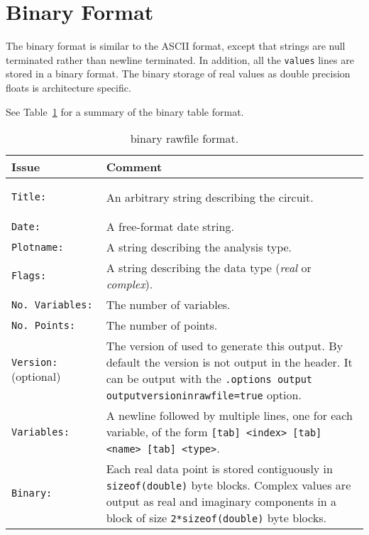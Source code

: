 \section{Binary Format}
\label{rawformatbinary}

The binary format is similar to the ASCII format, except that strings are null
terminated rather than newline terminated. In addition, all the \texttt{values}
lines are stored in a binary format. The binary storage of real values as
double precision floats is architecture specific.

See Table~\ref{table_rawformatbinary} for a summary of the binary table format.

\begin{longtable}[h] {>{\raggedright\small}m{1.5in}|>{\raggedright\let\\\tabularnewline\small}m{4.5in}}
  \caption{\Xyce{} binary rawfile format.} \\ \hline
  \rowcolor{XyceDarkBlue}
  \color{white}\bf Issue & 
  \color{white}\bf Comment \\ \hline \endfirsthead  
  \label{table_rawformatbinary}

    \texttt{Title:} & 
    An arbitrary string describing the circuit.
    \\ \hline

    \texttt{Date:} & 
    A free-format date string.
    \\ \hline

    \texttt{Plotname:} & 
    A string describing the analysis type.
    \\ \hline

    \texttt{Flags:} & 
    A string describing the data type (\emph{real} or \emph{complex}).
    \\ \hline

    \texttt{No.~Variables:} & 
    The number of variables.
    \\ \hline

    \texttt{No.~Points:} & 
    The number of points.
    \\ \hline
    
    \texttt{Version:} (optional) &
    The version of \Xyce{} used to generate this output. By default the version is not output in the header.  It can 
    be output with the \texttt{.options output outputversioninrawfile=true} option.
    \\ \hline

    \texttt{Variables:} & 
    A newline followed by multiple lines, one for each variable, of the form 
    \texttt{[tab] <index> [tab] <name> [tab] <type>}.
    \\ \hline

    \texttt{Binary:} & 
    Each real data point is stored contiguously in \texttt{sizeof(double)} byte blocks. 
    Complex values are output as real and imaginary components in a block of size 
    \texttt{2*sizeof(double)} byte blocks.
    \\ \hline

\end{longtable}


